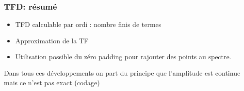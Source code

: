 \documentclass{beamer}
\begin{document}
\begin{frame}
\frametitle{TFD: résumé}
\begin{itemize}
\item TFD calculable par ordi : nombre finis de termes 
\vspace{0.3cm}
\item<2-> Approximation de la TF
\vspace{0.3cm}
\item<3-> Utilisation possible du zéro padding pour rajouter des points au spectre.

\end{itemize}
\vspace{1cm}
Dans tous ces développements on part du principe que l'amplitude est continue mais ce n'est pas exact (codage)
\end{frame}
\end{document}
